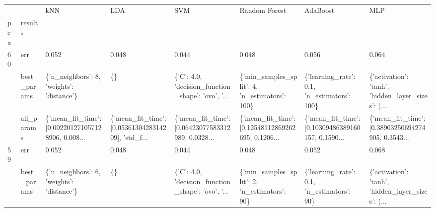 \begin{tabular}{llllllll}
\toprule
   &            &                                                kNN &                                                LDA &                                                SVM &                                      Random Forest &                                           AdaBoost &                                                MLP \\
pca & results &                                                    &                                                    &                                                    &                                                    &                                                    &                                                    \\
\midrule
60 & err &                                              0.052 &                                              0.048 &                                              0.044 &                                              0.048 &                                              0.056 &                                              0.064 \\
   & best\_params &          \{'n\_neighbors': 8, 'weights': 'distance'\} &                                                 \{\} &  \{'C': 4.0, 'decision\_function\_shape': 'ovo', '... &      \{'min\_samples\_split': 4, 'n\_estimators': 100\} &        \{'learning\_rate': 0.1, 'n\_estimators': 100\} &  \{'activation': 'tanh', 'hidden\_layer\_sizes': (... \\
   & all\_params &  \{'mean\_fit\_time': [0.002201271057128906, 0.008... &  \{'mean\_fit\_time': [0.0536130428314209], 'std\_f... &  \{'mean\_fit\_time': [0.06423077583312989, 0.0328... &  \{'mean\_fit\_time': [0.12548112869262695, 0.1206... &  \{'mean\_fit\_time': [0.10309486389160157, 0.1590... &  \{'mean\_fit\_time': [0.38903250694274905, 0.3543... \\
59 & err &                                              0.052 &                                              0.048 &                                              0.044 &                                              0.048 &                                              0.052 &                                              0.068 \\
   & best\_params &          \{'n\_neighbors': 6, 'weights': 'distance'\} &                                                 \{\} &  \{'C': 4.0, 'decision\_function\_shape': 'ovo', '... &       \{'min\_samples\_split': 2, 'n\_estimators': 90\} &         \{'learning\_rate': 0.1, 'n\_estimators': 90\} &  \{'activation': 'tanh', 'hidden\_layer\_sizes': (... \\

\end{tabular}
